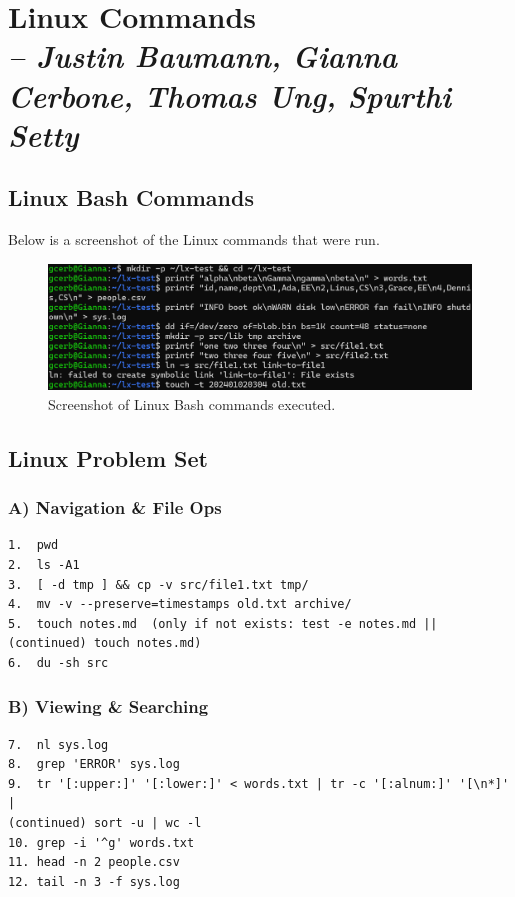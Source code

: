 \chapter{Linux Commands \\
\small{\textit{-- Justin Baumann, Gianna Cerbone, Thomas Ung, Spurthi Setty}}
\label{Chapter::LinuxCommands}}

\section{Linux Bash Commands \label{Section:TerminalOutput}}

Below is a screenshot of the Linux commands that were run.

\begin{figure}[h!]
    \centering
    \includegraphics[width=1.0\textwidth]{eps/LinuxBash.eps}
    \caption{Screenshot of Linux Bash commands executed.}
    \label{fig:LinuxBash}
\end{figure}

\section{Linux Problem Set}

\subsection*{A) Navigation \& File Ops}
\begin{verbatim}
1.  pwd
2.  ls -A1
3.  [ -d tmp ] && cp -v src/file1.txt tmp/
4.  mv -v --preserve=timestamps old.txt archive/
5.  touch notes.md  (only if not exists: test -e notes.md || 
(continued) touch notes.md)
6.  du -sh src
\end{verbatim}

\subsection*{B) Viewing \& Searching}
\begin{verbatim}
7.  nl sys.log
8.  grep 'ERROR' sys.log
9.  tr '[:upper:]' '[:lower:]' < words.txt | tr -c '[:alnum:]' '[\n*]' | 
(continued) sort -u | wc -l
10. grep -i '^g' words.txt
11. head -n 2 people.csv
12. tail -n 3 -f sys.log
\end{verbatim}


